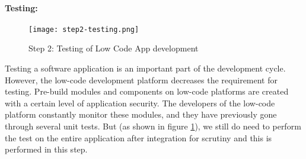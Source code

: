 \paragraph*{Testing:}
\begin{figure}[htbp!]
  \centering    
  \texttt{[image: step2-testing.png]}
  \caption[Testing]{Step 2: Testing of Low Code App development}
  \label{fig:background:testing}
\end{figure}
Testing a software application is an important part of the development cycle.
However, the low-code development platform decreases the requirement for testing. 
Pre-build modules and components on low-code platforms are created with a certain level of application security. 
The developers of the low-code platform constantly monitor these modules, and they have previously gone through several unit tests.
But (as shown in figure \ref{fig:background:testing}), we still do need to perform the test on the entire application after integration for scrutiny and this is performed in this step.
